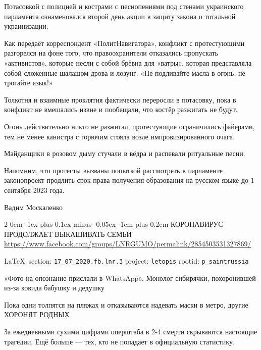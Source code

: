 \documentclass[a4paper,11pt]{extreport}
\makeatletter
\renewcommand\subsection{%
  \clearpage
    \@startsection{subsection}%
    {2}%
    {0em}%
    {-1ex plus 0.1ex minus -0.05ex}%
    {-1em plus 0.2em}%
    {\scshape\bfseries\Large}%
}
\makeatother
\begin{document}
Потасовкой с полицией и кострами с песнопениями под стенами украинского
парламента ознаменовался второй день акции в защиту закона о тотальной
украинизации.

Как передаёт корреспондент «ПолитНавигатора», конфликт с протестующими
разгорелся на фоне того, что правоохранители отказались пропускать
«активистов», которые несли с собой брёвна для «ватры», которая представляла
собой сложенные шалашом дрова и лозунг: «Не подливайте масла в огонь, не
трогайте язык!»

Толкотня и взаимные проклятия фактически переросли в потасовку, пока в конфликт
не вмешались извне и пообещали, что костёр разжигать не будут.

Огонь действительно никто не разжигал, протестующие ограничились файерами, тем
не менее канистра с горючим стояла возле импровизированного очага.

Майданщики в розовом дыму стучали в вёдра и распевали ритуальные песни.

Напомним, что протесты вызваны попыткой рассмотреть в парламенте законопроект
продлить срок права получения образования на русском языке до 1 сентября 2023
года.

Вадим Москаленко 
 
 

\subsection{КОРОНАВИРУС ПРОДОЛЖАЕТ ВЫКАШИВАТЬ СЕМЬИ}
\label{sec:17_07_2020.fb.lnr.3}
\url{https://www.facebook.com/groups/LNRGUMO/permalink/2854503531327869/}
  
\vspace{0.5cm}
{\ifDEBUG\small\LaTeX~section: \verb|17_07_2020.fb.lnr.3| project: \verb|letopis| rootid: \verb|p_saintrussia|\fi}
\vspace{0.5cm}

«Фото на опознание прислали в WhatsApp».  Монолог сибирячки, похоронившей из-за
ковида бабушку и дедушку

Пока одни толпятся на пляжах и отказываются надевать маски в метро, другие
ХОРОНЯТ РОДНЫХ

За ежедневными сухими цифрами оперштаба в 2-4 смерти скрываются настоящие
трагедии.  Ещё больше --- тех, кто не попадает в официальную статистику.
\end{document}
